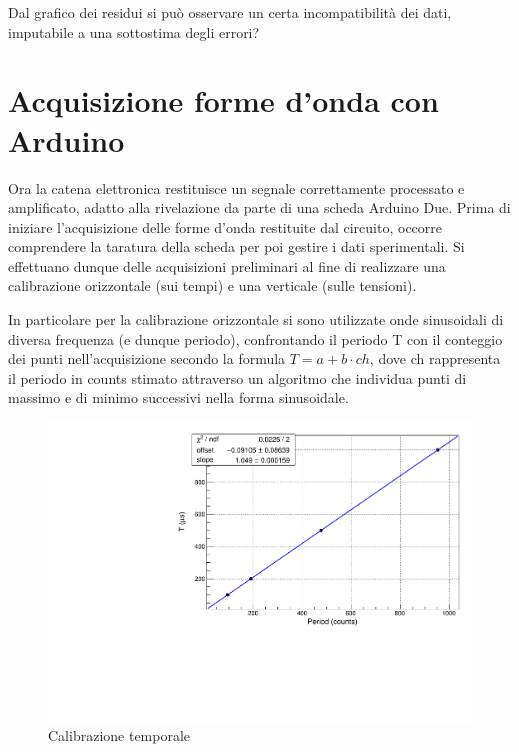 \documentclass{article}
\begin{document}
Dal grafico dei residui si può osservare un certa incompatibilità dei dati, imputabile a una sottostima degli errori? 

\section{Acquisizione forme d'onda con Arduino}

Ora la catena elettronica restituisce un segnale correttamente processato e amplificato, adatto alla rivelazione da parte di una scheda Arduino Due. Prima di iniziare
l'acquisizione delle forme d'onda restituite dal circuito, occorre comprendere la taratura della scheda per poi gestire i dati sperimentali. Si effettuano dunque delle 
acquisizioni preliminari al fine di realizzare una calibrazione orizzontale (sui tempi) e una verticale (sulle tensioni).

In particolare per la calibrazione orizzontale si sono utilizzate onde sinusoidali di diversa frequenza (e dunque periodo), confrontando
il periodo T con il conteggio dei punti nell'acquisizione secondo la formula $T = a + b \cdot ch$, dove ch rappresenta il periodo in 
counts stimato attraverso un algoritmo che individua punti di massimo e di minimo successivi nella forma sinusoidale.

\begin{center}
\begin{figure}[H]
\centering
\includegraphics[scale=0.4, angle=0]{calibtempi.pdf}
\caption{Calibrazione temporale}
\label{fig:calibtempi}
\end{figure}
\end{center}
\end{document}
